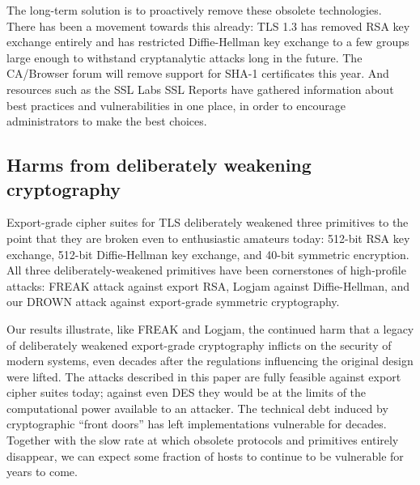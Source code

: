 The long-term solution is to proactively remove these obsolete technologies.  There has been a movement towards this already: TLS 1.3 has removed RSA key exchange entirely and has restricted Diffie-Hellman key exchange to a few groups large enough to withstand cryptanalytic attacks long in the future.  The CA/Browser forum will remove support for SHA-1 certificates this year.  And resources such as the SSL Labs SSL Reports have gathered information about best practices and vulnerabilities in one place, in order to encourage administrators to make the best choices.

\subsection{Harms from deliberately weakening cryptography}

Export-grade cipher suites for TLS deliberately weakened three primitives to the point that they are broken even to enthusiastic amateurs today: 512-bit RSA key exchange, 512-bit Diffie-Hellman key exchange, and 40-bit symmetric encryption.
All three deliberately-weakened primitives have been cornerstones of high-profile attacks: FREAK attack against export RSA, Logjam against Diffie-Hellman, and our DROWN attack against export-grade symmetric cryptography.

Our results illustrate, like FREAK and Logjam, the continued harm that a legacy of deliberately weakened export-grade cryptography inflicts on the security of modern systems, even decades after the regulations influencing the original design were lifted.  The attacks described in this paper are fully feasible against export cipher suites today; against even DES they would be at the limits of the computational power available to an attacker.  The technical debt induced by cryptographic ``front doors'' has left implementations vulnerable for decades.  Together with the slow rate at which obsolete protocols and primitives entirely disappear, we can expect some fraction of hosts to continue to be vulnerable for years to come.

